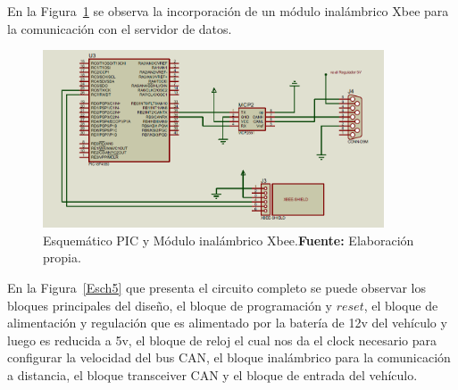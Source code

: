 


En la Figura~\ref{Esch3} se observa la incorporación de un módulo inalámbrico Xbee para la comunicación con el servidor de datos. 


\begin{figure}[H]
	\centering
		\includegraphics[width=0.9\textwidth]{./Cap4imagen/xbee_4.png}
	\caption[Esquemático PIC y Módulo inalámbrico Xbee.]{Esquemático PIC y Módulo inalámbrico Xbee.\textbf{Fuente:} Elaboración propia.}
	\label{Esch3} %
\end{figure}



 En la Figura~\ref{Esch5} que presenta el circuito completo se puede observar los bloques principales del diseño, el bloque de programación y $reset$, el bloque de alimentación y regulación que es alimentado por la batería de 12v del vehículo y luego es reducida a 5v, el bloque de reloj el cual nos da el clock necesario para configurar la velocidad del bus CAN, el bloque inalámbrico para la comunicación a distancia, el bloque transceiver CAN y el bloque de entrada del vehículo. 
 


